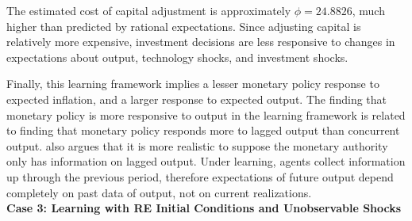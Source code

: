 The estimated cost of capital adjustment is approximately $\phi=24.8826$, much higher than predicted by rational expectations.  Since adjusting capital is relatively more expensive, investment decisions are less responsive to changes in expectations about output, technology shocks, and investment shocks.

Finally, this learning framework implies a lesser monetary policy response to expected inflation, and a larger response to expected output.  The finding that monetary policy is more responsive to output in the learning framework is related to  finding that monetary policy responds more to lagged output than concurrent output.   also argues that it is more realistic to suppose the monetary authority only has information on lagged output.  Under learning, agents collect information up through the previous period, therefore expectations of future output depend completely on past data of output, not on current realizations. \\

\noindent \textbf{Case 3: Learning with RE Initial Conditions and Unobservable Shocks}

